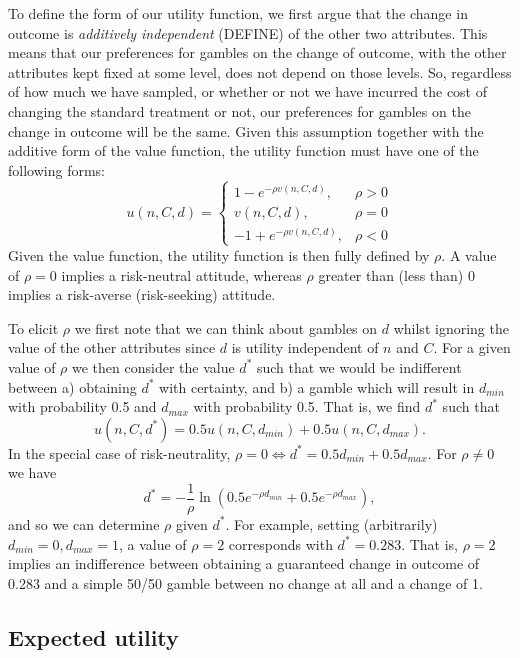 \documentclass[sagev, Crown]{sagej}
\begin{document}
To define the form of our utility function, we first argue that the change in outcome is \emph{additively independent} (DEFINE) of the other two attributes. This means that our preferences for gambles on the change of outcome, with the other attributes kept fixed at some level, does not depend on those levels. So, regardless of how much we have sampled, or whether or not we have incurred the cost of changing the standard treatment or not, our preferences for gambles on the change in outcome will be the same. Given this assumption together with the additive form of the value function, the utility function must have one of the following\cite{French2000} forms:
$$
u(n, C, d) =
\begin{cases}
1 - e^{-\rho v(n, C, d)}, &\rho > 0 \\
v(n, C, d), &\rho = 0 \\
-1 + e^{-\rho v(n, C, d)}, &\rho < 0 
\end{cases}
$$
Given the value function, the utility function is then fully defined by $\rho$. A value of $\rho = 0$ implies a risk-neutral attitude, whereas $\rho$ greater than (less than) 0 implies a risk-averse (risk-seeking) attitude. 

To elicit $\rho$ we first note that we can think about gambles on $d$ whilst ignoring the value of the other attributes since $d$ is utility independent of $n$ and $C$. For a given value of $\rho$ we then consider the value $d^*$ such that we would be indifferent between a) obtaining $d^*$ with certainty, and b) a gamble which will result in $d_{min}$ with probability 0.5 and $d_{max}$ with probability 0.5. That is, we find $d^*$ such that
$$
u(n, C, d^*) = 0.5u(n, C, d_{min}) + 0.5u(n, C, d_{max}).
$$
In the special case of risk-neutrality, $\rho = 0 \Leftrightarrow d^* = 0.5d_{min} + 0.5d_{max}$. For $\rho \neq 0$ we have
$$
d^* = - \frac{1}{\rho} \ln\left( 0.5e^{-\rho d_{min}} + 0.5e^{-\rho d_{max}} \right),
$$
and so we can determine $\rho$ given $d^*$. For example, setting (arbitrarily) $d_{min} = 0, d_{max} = 1$, a value of $\rho = 2$ corresponds with $d^* =  0.283$. That is, $\rho = 2$ implies an indifference between obtaining a guaranteed change in outcome of 0.283 and a simple 50/50 gamble between no change at all and a change of 1. 


\subsection{Expected utility}
\end{document}
